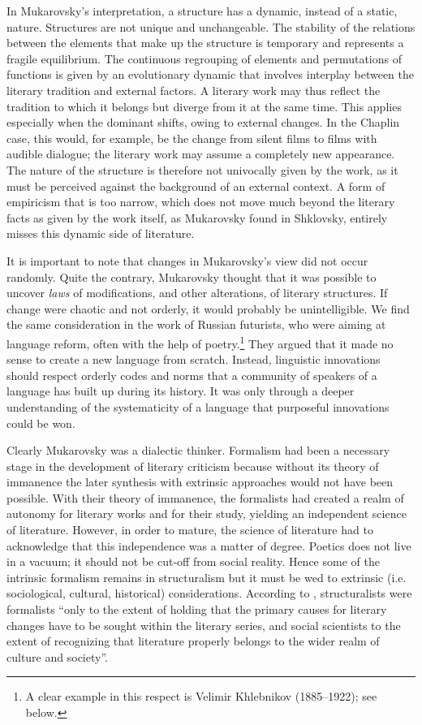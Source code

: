 \documentclass[output=paper]{langscibook}
\begin{document}
In Mukarovsky's interpretation, a structure has a dynamic, instead of a static, nature. Structures are not unique and unchangeable. The stability of the relations between the elements that make up the structure is temporary and represents a fragile equilibrium. The continuous regrouping of elements and permutations of functions is given by an evolutionary dynamic that involves interplay between the literary tradition and external factors. A literary work may thus reflect the tradition to which it belongs but diverge from it at the same time. This applies especially when the dominant shifts, owing to external changes. In the Chaplin case, this would, for example, be the change from silent films to films with audible dialogue; the literary work may assume a completely new appearance. The nature of the structure is therefore not univocally given by the work, as it must be perceived against the background of an external context. A form of empiricism that is too narrow, which does not move much beyond the literary facts as given by the work itself, as Mukarovsky found in Shklovsky, entirely misses this dynamic side of literature.

\largerpage[1]It is important to note that changes in Mukarovsky's view did not occur randomly. Quite the contrary, Mukarovsky thought that it was possible to uncover \emph{laws} of modifications, and other alterations, of literary structures. If change were chaotic and not orderly, it would probably be unintelligible. We find the same consideration in the work of Russian futurists, who were aiming at language reform, often with the help of poetry.\footnote{A clear example in this respect is Velimir Khlebnikov (1885--1922); see below.} They argued that it made no sense to create a new language from scratch. Instead, linguistic innovations should respect orderly codes and norms that a community of speakers of a language has built up during its history. It was only through a deeper understanding of the systematicity of a language that purposeful innovations could be won. 

Clearly Mukarovsky was a dialectic thinker. Formalism had been a necessary stage in the development of literary criticism because without its theory of immanence the later synthesis with extrinsic approaches would not have been possible. With their theory of immanence, the formalists had created a realm of autonomy for literary works and for their study, yielding an independent science of literature. However, in order to mature, the science of literature had to acknowledge that this independence was a matter of degree. Poetics does not live in a vacuum; it should not be cut-off from social reality. Hence some of the intrinsic formalism remains in structuralism but it must be wed to extrinsic (i.e. sociological, cultural, historical) considerations. According to \citet[38]{Galan1985}, structuralists were formalists ``only to the extent of holding that the primary causes for literary changes have to be sought within the literary series, and social scientists to the extent of recognizing that literature properly belongs to the wider realm of culture and society''.
\end{document}
